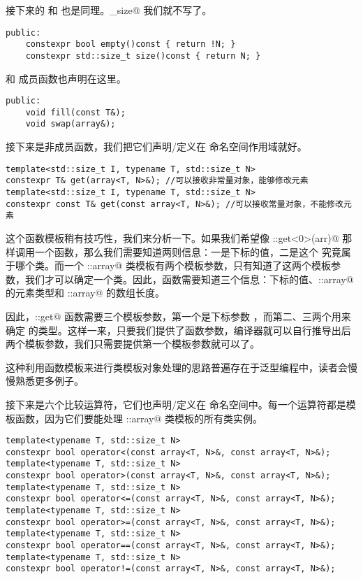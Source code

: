 接下来的 \lstinline@size@ 和 \lstinline@empty@ 也是同理。\lstinline@max_size@ 我们就不写了。
\begin{lstlisting}
public:
    constexpr bool empty()const { return !N; }
    constexpr std::size_t size()const { return N; }
\end{lstlisting}\par
\lstinline@fill@ 和 \lstinline@swap@ 成员函数也声明在这里。
\begin{lstlisting}
public:
    void fill(const T&);
    void swap(array&);
\end{lstlisting}\par
接下来是非成员函数，我们把它们声明/定义在 \lstinline@user@ 命名空间作用域就好。
\begin{lstlisting}
template<std::size_t I, typename T, std::size_t N>
constexpr T& get(array<T, N>&); //可以接收非常量对象，能够修改元素
template<std::size_t I, typename T, std::size_t N>
constexpr const T& get(const array<T, N>&); //可以接收常量对象，不能修改元素
\end{lstlisting}
这个函数模板稍有技巧性，我们来分析一下。如果我们希望像 \lstinline@user::get<0>(arr)@ 那样调用一个函数，那么我们需要知道两则信息：一是下标的值，二是这个 \lstinline@arr@ 究竟属于哪个类。而一个 \lstinline@user::array@ 类模板有两个模板参数，只有知道了这两个模板参数，我们才可以确定一个类。因此，\lstinline@get@ 函数需要知道三个信息：下标的值、\lstinline@user::array@ 的元素类型和 \lstinline@user::array@ 的数组长度。\par
因此，\lstinline@user::get@ 函数需要三个模板参数，第一个是下标参数 \lstinline@I@，而第二、三两个用来确定 \lstinline@arr@ 的类型。这样一来，只要我们提供了函数参数，编译器就可以自行推导出后两个模板参数，我们只需要提供第一个模板参数就可以了。\par
这种利用函数模板来进行类模板对象处理的思路普遍存在于泛型编程中，读者会慢慢熟悉更多例子。\par
接下来是六个比较运算符，它们也声明/定义在 \lstinline@user@ 命名空间中。每一个运算符都是模板函数，因为它们要能处理 \lstinline@user::array@ 类模板的所有类实例。
\begin{lstlisting}
template<typename T, std::size_t N>
constexpr bool operator<(const array<T, N>&, const array<T, N>&);
template<typename T, std::size_t N>
constexpr bool operator>(const array<T, N>&, const array<T, N>&);
template<typename T, std::size_t N>
constexpr bool operator<=(const array<T, N>&, const array<T, N>&);
template<typename T, std::size_t N>
constexpr bool operator>=(const array<T, N>&, const array<T, N>&);
template<typename T, std::size_t N>
constexpr bool operator==(const array<T, N>&, const array<T, N>&);
template<typename T, std::size_t N>
constexpr bool operator!=(const array<T, N>&, const array<T, N>&);
\end{lstlisting}\par
